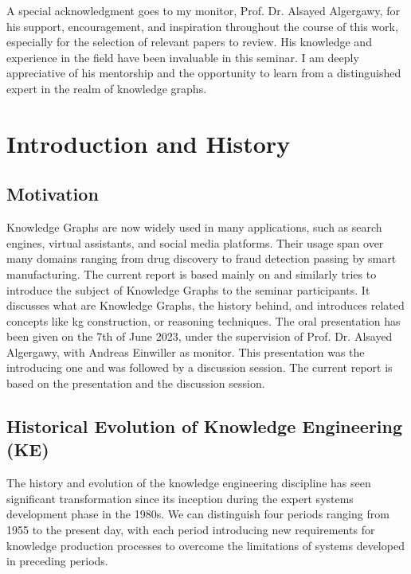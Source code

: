 \documentclass[11pt]{article} %
\begin{document}
A special acknowledgment goes to my monitor, Prof. Dr. Alsayed Algergawy, for his support, encouragement, and inspiration throughout the course of this work, especially for the selection of relevant papers to review. His knowledge and experience in the field have been invaluable in this seminar. I am deeply appreciative of his mentorship and the opportunity to learn from a distinguished expert in the realm of knowledge graphs.

\newpage

\tableofcontents
\listoffigures
\listoftables
\newpage

\section{Introduction and History}

\subsection{Motivation}
Knowledge Graphs are now widely used in many applications, such as search engines, virtual assistants, and social media platforms. Their usage span over many domains ranging from drug discovery to fraud detection passing by smart manufacturing. The current report is based mainly on  and similarly tries to introduce the subject of Knowledge Graphs to the seminar participants. It discusses what are Knowledge Graphs, the history behind, and introduces related concepts like \acrshort{kg} construction, or reasoning techniques. The oral presentation has been given on the 7th of June 2023, under the supervision of Prof. Dr. Alsayed Algergawy, with Andreas Einwiller as monitor. This presentation was the introducing one and was followed by a discussion session. The current report is based on the presentation and the discussion session.

\subsection{Historical Evolution of Knowledge Engineering (KE)}
The history and evolution of the knowledge engineering discipline has seen significant transformation since its inception during the expert systems development phase in the 1980s. We can distinguish four periods ranging from 1955 to the present day, with each period introducing new requirements for knowledge production processes to overcome the limitations of systems developed in preceding periods.
\end{document}
